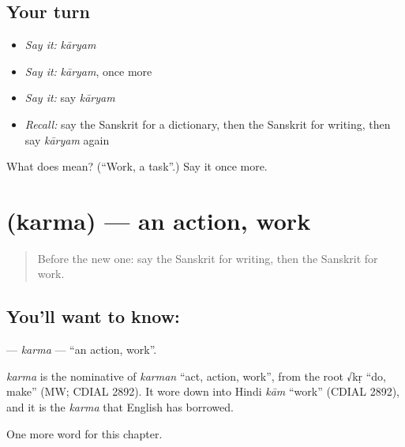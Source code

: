 \subsection*{Your turn}
\begin{itemize}
\raggedright
  \item \emph{Say it:} \emph{kāryam}
  \item \emph{Say it:} \emph{kāryam}, once more
  \item \emph{Say it:} say \emph{kāryam}
  \item \emph{Recall:} say the Sanskrit for a dictionary, then the Sanskrit for writing, then say \emph{kāryam} again
\end{itemize}

\begin{tcolorbox}[breakable,colback=teal!4,colframe=teal!35!black,title={Before you move on}]
What does  mean? (\textquotedblleft{}Work, a task\textquotedblright{}.) Say it once more.
\end{tcolorbox}
\section[\texorpdfstring{\sk{कर्म} (karma)}{कर्म (karma)}]{ (karma) — an action, work}

\label{lesson:SA-C170-karma}



\begin{quote}
Before the new one: say the Sanskrit for writing, then the Sanskrit for work.
\end{quote}

\subsection*{You'll want to know: }
\textbf{} — \emph{karma} — \textquotedblleft{}an action, work\textquotedblright{}.

\begin{cousinweb}
\emph{karma} is the nominative of \emph{karman} \textquotedblleft{}act, action, work\textquotedblright{}, from the root √kṛ \textquotedblleft{}do, make\textquotedblright{} (MW; CDIAL 2892). It wore down into Hindi \emph{kām} \textquotedblleft{}work\textquotedblright{} (CDIAL 2892), and it is the \emph{karma} that English has borrowed.
\end{cousinweb}

\begin{grammarlens}[title={What you've built}]
One more word for this chapter.
\end{grammarlens}

